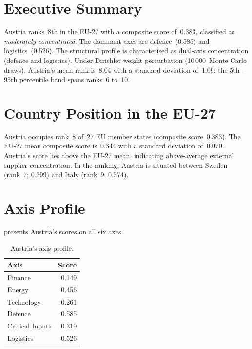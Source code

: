 \documentclass[12pt,a4paper]{article}
\begin{document}
\hypersetup{pageanchor=true}
\pagestyle{fancy}
\renewcommand{\headrulewidth}{0.4pt}


\section{Executive Summary}
\label{sec:summary}

Austria ranks~8th in the EU-27 with a composite \ISI score of~0.383, classified as \emph{moderately concentrated}.  The dominant axes are defence~(0.585) and logistics~(0.526).  The structural profile is characterised as dual-axis concentration (defence and logistics).  Under Dirichlet weight perturbation (10\,000~Monte Carlo draws), Austria's mean rank is~8.04 with a standard deviation of~1.09; the 5th--95th percentile band spans ranks~6 to~10.


\section{Country Position in the EU-27}
\label{sec:position}

Austria occupies rank~8 of~27 EU member states (composite score~0.383).  The EU-27 mean composite score is~0.344 with a standard deviation of~0.070.  Austria's score lies above the EU-27 mean, indicating above-average external supplier concentration.  In the ranking, Austria is situated between Sweden (rank~7; 0.399) and Italy (rank~9; 0.374).


\section{Axis Profile}
\label{sec:axis-profile}

 presents Austria's scores on all six \ISI axes.

\begin{table}[htbp]
\centering\small
\caption{Austria's \ISI axis profile.}
\label{tab:axis-profile}
\begin{tabular}{@{}lr@{}}
\toprule
\textbf{Axis} & \textbf{Score} \\
\midrule
    Finance           & 0.149 \\
    Energy            & 0.456 \\
    Technology        & 0.261 \\
    Defence           & 0.585 \\
    Critical Inputs   & 0.319 \\
    Logistics         & 0.526 \\
\bottomrule
\end{tabular}
\end{table}
\end{document}
